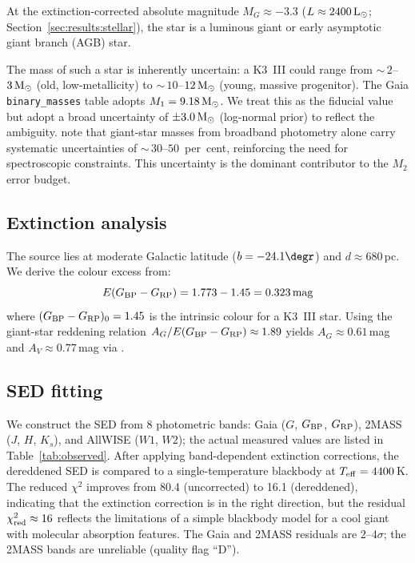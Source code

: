 \documentclass[usenatbib,fleqn]{mnras}
\newcommand{\Msun}{{\rm M}_\odot}
\newcommand{\Lsun}{{\rm L}_\odot}
\begin{document}
At the extinction-corrected absolute magnitude
$M_G \approx -3.3$
($L \approx 2400\,\Lsun$; Section~\ref{sec:results:stellar}),
the star is a luminous giant or early asymptotic giant branch
(AGB) star.

The mass of such a star is inherently uncertain: a K3~III could
range from $\sim$\,$2$--$3\,\Msun$ (old, low-metallicity) to
$\sim$\,$10$--$12\,\Msun$ (young, massive progenitor).  The Gaia
\texttt{binary\_masses} table adopts $M_1 = 9.18\,\Msun$.  We
treat this as the fiducial value but adopt a broad uncertainty of
$\pm 3.0\,\Msun$ (log-normal prior) to reflect the ambiguity.
\citet{Andrae2023} note that giant-star masses from broadband
photometry alone carry systematic uncertainties of
$\sim$\,$30$--$50$~per~cent, reinforcing the need for
spectroscopic constraints.
This uncertainty is the dominant contributor to the $M_2$ error
budget.

\subsection{Extinction analysis}
\label{sec:methods:extinction}

The source lies at moderate Galactic latitude ($b = -24.1\degr$)
and $d \approx 680$\,pc.  We derive the colour excess from:
\begin{equation}
E(G_{\rm BP} - G_{\rm RP}) = 1.773 - 1.45 = 0.323\,{\rm mag}
\end{equation}
where $(G_{\rm BP} - G_{\rm RP})_0 = 1.45$ is the intrinsic
colour for a K3~III star.  Using the giant-star reddening relation
$A_G / E(G_{\rm BP} - G_{\rm RP}) \approx 1.89$
\citep{GaiaCollaboration2023} yields $A_G \approx 0.61$\,mag and
$A_V \approx 0.77$\,mag via \citet{Cardelli1989}.

\subsection{SED fitting}
\label{sec:methods:sed}

We construct the SED from 8 photometric bands: Gaia ($G$,
$G_{\rm BP}$, $G_{\rm RP}$), 2MASS ($J$, $H$, $K_s$), and
AllWISE ($W1$, $W2$); the actual measured values are listed in
Table~\ref{tab:observed}.
After applying band-dependent extinction corrections, the
dereddened SED is compared to a single-temperature blackbody at
$T_{\rm eff} = 4400$\,K.  The reduced $\chi^2$ improves from
80.4 (uncorrected) to 16.1 (dereddened), indicating that the
extinction correction is in the right direction, but the residual
$\chi^2_{\rm red} \approx 16$ reflects the limitations of a simple
blackbody model for a cool giant with molecular absorption features.
The Gaia and 2MASS residuals are $2$--$4\sigma$; the 2MASS bands
are unreliable (quality flag ``D'').
\end{document}
